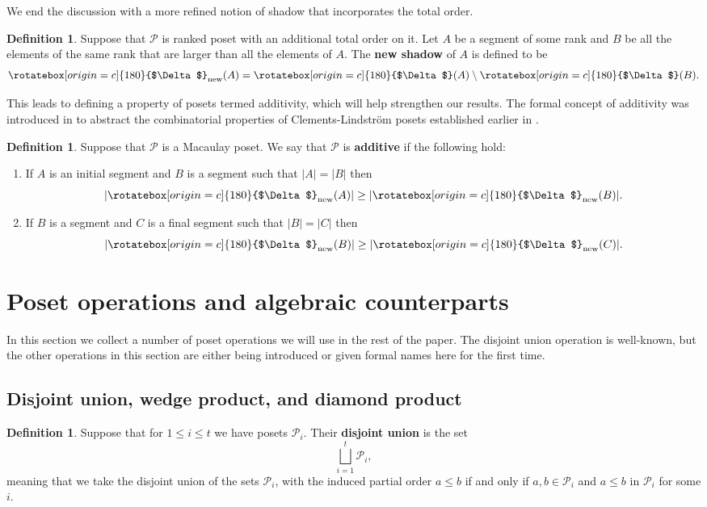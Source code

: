 \documentclass[11pt, reqno]{amsart}
\renewcommand{\P}{{\mathcal P}}
\newcommand{\uSdw}{\rotatebox[origin=c]{180}{$\Delta$}}
\theoremstyle{plain} %
\theoremstyle{definition}
\newtheorem{defn}[thm]{Definition}
\theoremstyle{remark}
\numberwithin{equation}{section}  %
\begin{document}
We end the discussion  with a more refined notion of shadow that incorporates the total order.

\begin{defn}
		Suppose that $\mathcal{P}$ is ranked poset with an additional total order  on it.
		Let $A$ be a segment of some rank and $B$ be all the elements of the same rank that are larger than all the elements of $A$.
		The {\bf new shadow} of $A$ is defined to be
		\begin{align*}
			\uSdw_{\text{new}} (A) = \uSdw(A)\setminus \uSdw(B).
		\end{align*}
\end{defn}

This leads to defining a property of posets termed additivity, which will help strengthen our results. The formal concept of additivity was introduced in \cite{ClementsAdditive} to abstract the combinatorial properties of Clements-Lindstr\"om posets established earlier in \cite{Clements1}. 


\begin{defn}
		Suppose that $\mathcal{P}$ is a Macaulay poset.
		We say that $\mathcal{P}$ is {\bf additive} if the following hold:
		\begin{enumerate}
			\item If $A$ is an initial segment and $B$ is a segment such that $|A|=|B|$ then 
			$$|\uSdw_{\text{new}}(A)| \geq |\uSdw_{\text{new}}(B)|.$$
			\item If $B$ is a segment and $C$ is a final segment such that $|B|=|C|$ then 
			$$|\uSdw_{\text{new}}(B)| \geq |\uSdw_{\text{new}}(C)|.$$
		\end{enumerate}
	\end{defn}


\section{Poset operations and algebraic counterparts}\label{s: poset operations}

In this section we collect a number of poset operations we will use in the rest of the paper. The disjoint union operation is  well-known, but the other operations in this section are either being introduced or given formal names here for the first time. 

\subsection{Disjoint union, wedge product, and diamond product}
\begin{defn}\label{def: disjointunion}
Suppose that for $1\leq i\leq t$ we have posets $\P_i$. Their {\bf disjoint union} is the set
$$
\bigsqcup_{i=1}^t \P_i,
$$
meaning that we take the disjoint union of the sets $\P_i$, with the induced partial order $a\leq b$ if and only if $a, b \in \P_i$ and $a\leq b$ in $\P_i$ for some $i$.
\end{defn}
\end{document}
